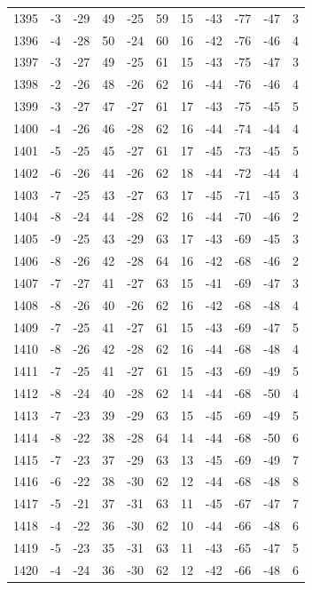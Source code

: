 \begin{table}[H]
\begin{tabular}{lllllllllll}
1395 & -3 & -29 & 49 & -25 & 59 & 15 & -43 & -77 & -47 & 3 \\
1396 & -4 & -28 & 50 & -24 & 60 & 16 & -42 & -76 & -46 & 4 \\
1397 & -3 & -27 & 49 & -25 & 61 & 15 & -43 & -75 & -47 & 3 \\
1398 & -2 & -26 & 48 & -26 & 62 & 16 & -44 & -76 & -46 & 4 \\
1399 & -3 & -27 & 47 & -27 & 61 & 17 & -43 & -75 & -45 & 5 \\
1400 & -4 & -26 & 46 & -28 & 62 & 16 & -44 & -74 & -44 & 4 \\
1401 & -5 & -25 & 45 & -27 & 61 & 17 & -45 & -73 & -45 & 5 \\
1402 & -6 & -26 & 44 & -26 & 62 & 18 & -44 & -72 & -44 & 4 \\
1403 & -7 & -25 & 43 & -27 & 63 & 17 & -45 & -71 & -45 & 3 \\
1404 & -8 & -24 & 44 & -28 & 62 & 16 & -44 & -70 & -46 & 2 \\
1405 & -9 & -25 & 43 & -29 & 63 & 17 & -43 & -69 & -45 & 3 \\
1406 & -8 & -26 & 42 & -28 & 64 & 16 & -42 & -68 & -46 & 2 \\
1407 & -7 & -27 & 41 & -27 & 63 & 15 & -41 & -69 & -47 & 3 \\
1408 & -8 & -26 & 40 & -26 & 62 & 16 & -42 & -68 & -48 & 4 \\
1409 & -7 & -25 & 41 & -27 & 61 & 15 & -43 & -69 & -47 & 5 \\
1410 & -8 & -26 & 42 & -28 & 62 & 16 & -44 & -68 & -48 & 4 \\
1411 & -7 & -25 & 41 & -27 & 61 & 15 & -43 & -69 & -49 & 5 \\
1412 & -8 & -24 & 40 & -28 & 62 & 14 & -44 & -68 & -50 & 4 \\
1413 & -7 & -23 & 39 & -29 & 63 & 15 & -45 & -69 & -49 & 5 \\
1414 & -8 & -22 & 38 & -28 & 64 & 14 & -44 & -68 & -50 & 6 \\
1415 & -7 & -23 & 37 & -29 & 63 & 13 & -45 & -69 & -49 & 7 \\
1416 & -6 & -22 & 38 & -30 & 62 & 12 & -44 & -68 & -48 & 8 \\
1417 & -5 & -21 & 37 & -31 & 63 & 11 & -45 & -67 & -47 & 7 \\
1418 & -4 & -22 & 36 & -30 & 62 & 10 & -44 & -66 & -48 & 6 \\
1419 & -5 & -23 & 35 & -31 & 63 & 11 & -43 & -65 & -47 & 5 \\
1420 & -4 & -24 & 36 & -30 & 62 & 12 & -42 & -66 & -48 & 6 \\

\end{tabular}
\end{table}
